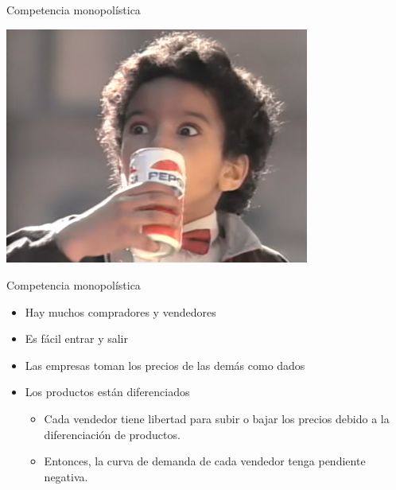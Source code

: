 \documentclass{beamer}
\begin{document}
\begin{frame}{Competencia monopolística}
\begin{center}
  \href{https://www.youtube.com/watch?v=po0jY4WvCIc}{\includegraphics[width=0.75\textwidth]{../Figures/Diferenciacion (1).png}}
\end{center}
\end{frame}

\begin{frame}{Competencia monopolística}
\begin{itemize}
    \item Hay muchos compradores y vendedores\vspace{2mm}
    \item Es fácil entrar y salir\vspace{2mm}
    \item Las empresas toman los precios de las demás como dados\vspace{2mm}
    \item Los productos están diferenciados\vspace{2mm}
    \begin{itemize}
        \item Cada vendedor tiene libertad para subir o bajar los precios debido a la diferenciación de productos.\vspace{1mm}
        \item Entonces, la curva de demanda de cada vendedor tenga pendiente negativa.
    \end{itemize}
    \end{itemize}
\end{frame}
\end{document}
